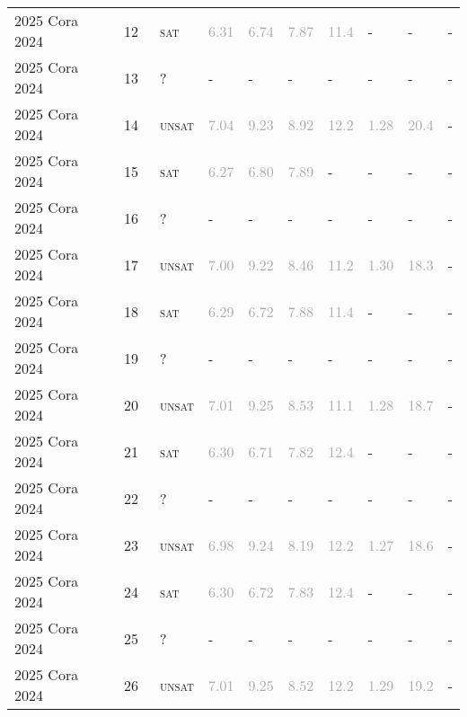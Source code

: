 \begin{center}
{\begin{longtable}{@{}llllllllll@{}}
2025 Cora 2024 & 12 & ~\textsc{sat} & \textcolor{darkgray}{6.31} & \textcolor{darkgray}{6.74} & \textcolor{darkgray}{7.87} & \textcolor{darkgray}{11.4} & - & - & - \\
2025 Cora 2024 & 13 & ~? & - & - & - & - & - & - & - \\
2025 Cora 2024 & 14 & ~\textsc{unsat} & \textcolor{darkgray}{7.04} & \textcolor{darkgray}{9.23} & \textcolor{darkgray}{8.92} & \textcolor{darkgray}{12.2} & \textcolor{darkgray}{1.28} & \textcolor{darkgray}{20.4} & - \\
2025 Cora 2024 & 15 & ~\textsc{sat} & \textcolor{darkgray}{6.27} & \textcolor{darkgray}{6.80} & \textcolor{darkgray}{7.89} & - & - & - & - \\
2025 Cora 2024 & 16 & ~? & - & - & - & - & - & - & - \\
2025 Cora 2024 & 17 & ~\textsc{unsat} & \textcolor{darkgray}{7.00} & \textcolor{darkgray}{9.22} & \textcolor{darkgray}{8.46} & \textcolor{darkgray}{11.2} & \textcolor{darkgray}{1.30} & \textcolor{darkgray}{18.3} & - \\
2025 Cora 2024 & 18 & ~\textsc{sat} & \textcolor{darkgray}{6.29} & \textcolor{darkgray}{6.72} & \textcolor{darkgray}{7.88} & \textcolor{darkgray}{11.4} & - & - & - \\
2025 Cora 2024 & 19 & ~? & - & - & - & - & - & - & - \\
2025 Cora 2024 & 20 & ~\textsc{unsat} & \textcolor{darkgray}{7.01} & \textcolor{darkgray}{9.25} & \textcolor{darkgray}{8.53} & \textcolor{darkgray}{11.1} & \textcolor{darkgray}{1.28} & \textcolor{darkgray}{18.7} & - \\
2025 Cora 2024 & 21 & ~\textsc{sat} & \textcolor{darkgray}{6.30} & \textcolor{darkgray}{6.71} & \textcolor{darkgray}{7.82} & \textcolor{darkgray}{12.4} & - & - & - \\
2025 Cora 2024 & 22 & ~? & - & - & - & - & - & - & - \\
2025 Cora 2024 & 23 & ~\textsc{unsat} & \textcolor{darkgray}{6.98} & \textcolor{darkgray}{9.24} & \textcolor{darkgray}{8.19} & \textcolor{darkgray}{12.2} & \textcolor{darkgray}{1.27} & \textcolor{darkgray}{18.6} & - \\
2025 Cora 2024 & 24 & ~\textsc{sat} & \textcolor{darkgray}{6.30} & \textcolor{darkgray}{6.72} & \textcolor{darkgray}{7.83} & \textcolor{darkgray}{12.4} & - & - & - \\
2025 Cora 2024 & 25 & ~? & - & - & - & - & - & - & - \\
2025 Cora 2024 & 26 & ~\textsc{unsat} & \textcolor{darkgray}{7.01} & \textcolor{darkgray}{9.25} & \textcolor{darkgray}{8.52} & \textcolor{darkgray}{12.2} & \textcolor{darkgray}{1.29} & \textcolor{darkgray}{19.2} & - \\

\end{longtable}}
\end{center}
